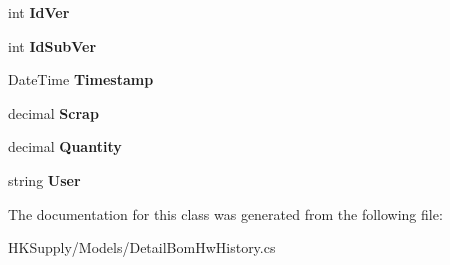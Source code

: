 \begin{DoxyCompactItemize}
\item 
\mbox{\label{class_h_k_supply_1_1_models_1_1_detail_bom_hw_history_acedd3a59362a463015e466ec30fc693c}} 
int {\bfseries Id\+Ver}
\item 
\mbox{\label{class_h_k_supply_1_1_models_1_1_detail_bom_hw_history_aaf9b211415044c2453c8366ecea31eb5}} 
int {\bfseries Id\+Sub\+Ver}
\item 
\mbox{\label{class_h_k_supply_1_1_models_1_1_detail_bom_hw_history_ad1fed9033e06743ddcbb8de31c073f88}} 
Date\+Time {\bfseries Timestamp}
\item 
\mbox{\label{class_h_k_supply_1_1_models_1_1_detail_bom_hw_history_aff1df7c71ba7ff268115844c9b09dcfa}} 
decimal {\bfseries Scrap}
\item 
\mbox{\label{class_h_k_supply_1_1_models_1_1_detail_bom_hw_history_ad2310152eae14f7e5c5c16bfa14afc44}} 
decimal {\bfseries Quantity}
\item 
\mbox{\label{class_h_k_supply_1_1_models_1_1_detail_bom_hw_history_ae5b1ba2788b4ed7298a9905dd93611b5}} 
string {\bfseries User}
\end{DoxyCompactItemize}


The documentation for this class was generated from the following file\+:\begin{DoxyCompactItemize}
\item 
H\+K\+Supply/\+Models/Detail\+Bom\+Hw\+History.\+cs\end{DoxyCompactItemize}

